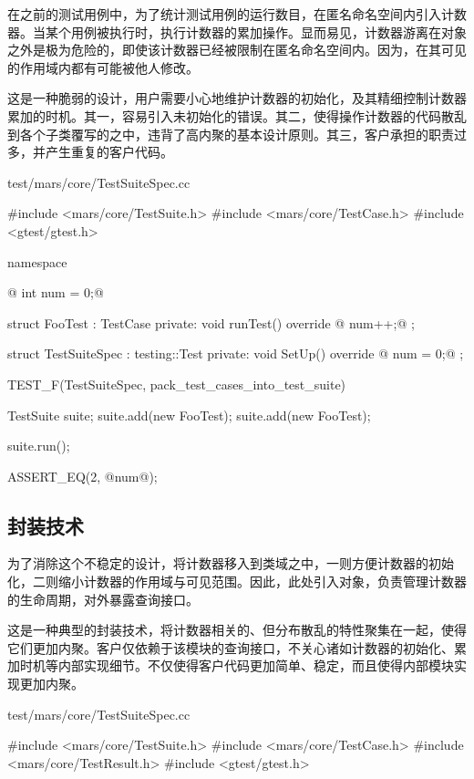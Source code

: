 \begin{content}

在之前的测试用例中，为了统计测试用例的运行数目，在匿名命名空间内引入计数器。当某个用例被执行时，执行计数器的累加操作。显而易见，计数器游离在对象之外是极为危险的，即使该计数器已经被限制在匿名命名空间内。因为，在其可见的作用域内都有可能被他人修改。

这是一种脆弱的设计，用户需要小心地维护计数器的初始化，及其精细控制计数器累加的时机。其一，容易引入未初始化的错误。其二，使得操作计数器的代码散乱到各个子类覆写的之中，违背了高内聚的基本设计原则。其三，客户承担的职责过多，并产生重复的客户代码。

\begin{nodiff}{test/mars/core/TestSuiteSpec.cc}
 \begin{c++}
#include <mars/core/TestSuite.h>
#include <mars/core/TestCase.h>
#include <gtest/gtest.h>

namespace {
@  int num = 0;@

  struct FooTest : TestCase {
  private:
    void runTest() override {
@      num++;@
    }
  };

  struct TestSuiteSpec : testing::Test {
  private:
    void SetUp() override {
@      num = 0;@
    }
  };
}

TEST_F(TestSuiteSpec, pack_test_cases_into_test_suite) {
  TestSuite suite;
  suite.add(new FooTest);
  suite.add(new FooTest);

  suite.run();

  ASSERT_EQ(2, @num@);
}
 \end{c++}
\end{nodiff}

\subsection{封装技术}

为了消除这个不稳定的设计，将计数器移入到类域之中，一则方便计数器的初始化，二则缩小计数器的作用域与可见范围。因此，此处引入对象，负责管理计数器的生命周期，对外暴露查询接口。

这是一种典型的封装技术，将计数器相关的、但分布散乱的特性聚集在一起，使得它们更加内聚。客户仅依赖于该模块的查询接口，不关心诸如计数器的初始化、累加时机等内部实现细节。不仅使得客户代码更加简单、稳定，而且使得内部模块实现更加内聚。

\begin{nodiff}{test/mars/core/TestSuiteSpec.cc}
 \begin{c++}
#include <mars/core/TestSuite.h>
#include <mars/core/TestCase.h>
#include <mars/core/TestResult.h>
#include <gtest/gtest.h>


\end{c++}
\end{nodiff}
\end{content}
